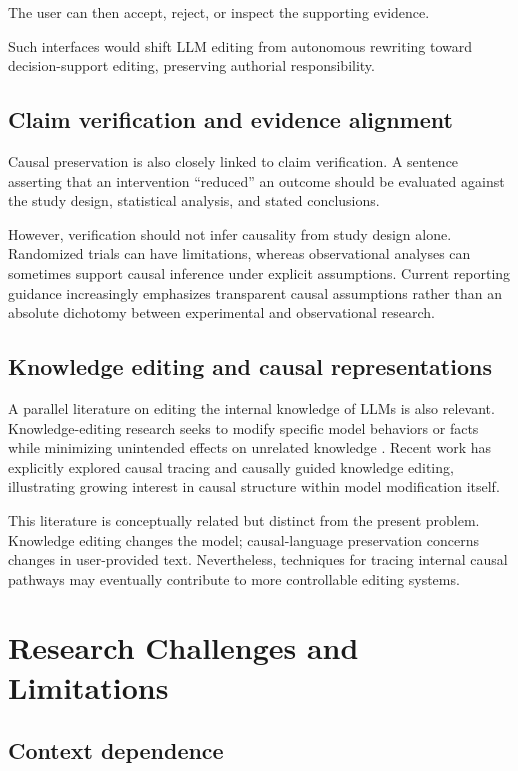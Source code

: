 \documentclass[11pt]{article}
\begin{document}
The user can then accept, reject, or inspect the supporting evidence.

Such interfaces would shift LLM editing from autonomous rewriting toward decision-support editing, preserving authorial responsibility.

\subsection{Claim verification and evidence alignment}

Causal preservation is also closely linked to claim verification. A sentence asserting that an intervention ``reduced'' an outcome should be evaluated against the study design, statistical analysis, and stated conclusions.

However, verification should not infer causality from study design alone. Randomized trials can have limitations, whereas observational analyses can sometimes support causal inference under explicit assumptions. Current reporting guidance increasingly emphasizes transparent causal assumptions rather than an absolute dichotomy between experimental and observational research.

\subsection{Knowledge editing and causal representations}

A parallel literature on editing the internal knowledge of LLMs is also relevant. Knowledge-editing research seeks to modify specific model behaviors or facts while minimizing unintended effects on unrelated knowledge \cite{yao2023}. Recent work has explicitly explored causal tracing and causally guided knowledge editing, illustrating growing interest in causal structure within model modification itself.

This literature is conceptually related but distinct from the present problem. Knowledge editing changes the model; causal-language preservation concerns changes in user-provided text. Nevertheless, techniques for tracing internal causal pathways may eventually contribute to more controllable editing systems.

\section{Research Challenges and Limitations}
\label{sec:research-challenges}

\subsection{Context dependence}
\end{document}

